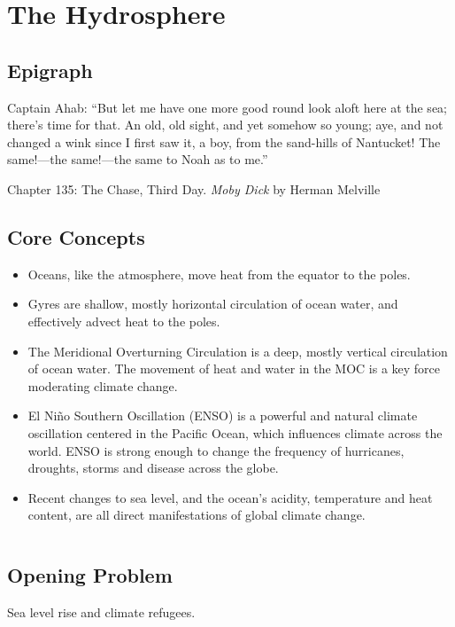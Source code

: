 \chapter{The Hydrosphere}\label{chap:Hydrosphere}
\section*{Epigraph}
\epigraph{Captain Ahab: ``But let me have one more good round look aloft here at the sea; there's time for that. An old, old sight, and yet somehow so young; aye, and not changed a wink since I first saw it, a boy, from the sand-hills of Nantucket! The same!---the same!---the same to Noah as to me.''}{Chapter 135: The Chase, Third Day. \textit{Moby Dick} by Herman Melville } 

\section{Core Concepts}
\begin{itemize}
	\item	Oceans, like the atmosphere, move heat from the equator to the poles.
	\item	Gyres are shallow, mostly horizontal circulation of ocean water, and effectively advect heat to the poles.
	\item The Meridional Overturning Circulation is a deep, mostly vertical circulation of ocean water. The movement of heat and water in the MOC is a key force moderating climate change.
	\item	El Ni\~no Southern Oscillation (ENSO) is a powerful and natural climate oscillation centered in the Pacific Ocean, which influences climate across the world. ENSO is strong enough to change the frequency of hurricanes, droughts, storms and disease across the globe.    
	\item	Recent changes to sea level, and the ocean's acidity, temperature and heat content, are all direct manifestations of global climate change. 
\end{itemize}
$\ $\\

\section{Opening Problem}
Sea level rise and climate refugees. 
$\ $\\

